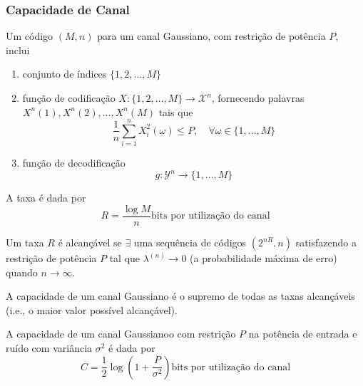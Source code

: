 \begin{frame}[allowframebreaks]
  \frametitle{Capacidade de Canal}

  \begin{definition}[código]
  Um código $(M,n)$ para um canal Gaussiano, com restrição de potência $P$, inclui
  \begin{enumerate}
  \item conjunto de índices $\{1, 2, \ldots, M\}$
  \item função de codificação $X: \{1, 2, \ldots, M\} \rightarrow \mathcal{X}^n$, fornecendo
	palavras $X^n(1), X^n(2), \ldots, X^n(M)$ tais que
	\begin{equation}
	\frac{1}{n} \sum_{i=1}^{n} X_i^2(\omega) \leq P, \quad \forall \omega \in \{1, \ldots, M\}
	\end{equation}
  \item função de decodificação
	\begin{equation}
	g: \mathcal{Y}^n \rightarrow \{1, \ldots, M\}
	\end{equation}
  \end{enumerate}
  \end{definition}

  \framebreak

  \begin{definition}[taxa]
  A taxa é dada por
	\begin{equation}
	R = \frac{\log M}{n} \text{bits por utilização do canal}
	\end{equation}
  \end{definition}

  \begin{definition}
  Um taxa $R$ é alcançável se $\exists$ uma sequência de códigos $(2^{nR},n)$ satisfazendo a
  restrição de potência $P$ tal que $\lambda^{(n)} \rightarrow 0$ (a probabilidade máxima de erro) 
  quando $n \rightarrow \infty$.
  \end{definition}

  \begin{definition}[capacidade]
  A capacidade de um canal Gaussiano é o supremo de todas as taxas alcançáveis
  (i.e., o maior valor possível alcançável).
  \end{definition}

  \framebreak

  \begin{theorem}
  A capacidade de um canal Gaussianoo com restrição $P$ na potência de entrada e ruído 
  com variância $\sigma^2$ é dada por
	\begin{equation}
	C = \frac{1}{2} \log \left( 1 + \frac{P}{\sigma^2} \right) \text{bits por utilização do canal}
	\end{equation}
  \end{theorem}


\end{frame}
